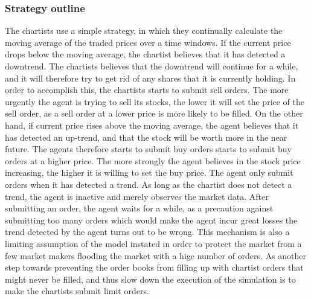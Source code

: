 \subsubsection{Strategy outline}
The chartists use a simple strategy, in which they continually calculate the moving average of the traded prices over a time windows. If the current price drops below the moving average, the chartist believes that it has detected a downtrend. The chartists believes that the downtrend will continue for a while, and it will therefore try to get rid of any shares that it is currently holding. In order to accomplish this, the chartists starts to submit sell orders. The more urgently the agent is trying to sell its stocks, the lower it will set the price of the sell order, as a sell order at a lower price is more likely to be filled. On the other hand, if current price rises above the moving average, the agent believes that it has detected an up-trend, and that the stock will be worth more in the near future. The agents therefore starts to submit buy orders starts to submit buy orders at a higher price. The more strongly the agent believes in the stock price increasing, the higher it is willing to set the buy price. The agent only submit orders when it has detected a trend. As long as the chartist does not detect a trend, the agent is inactive and merely observes the market data.  After submitting an order, the agent waits for a while, as a precaution against submitting too many orders which would make the agent incur great losses the trend detected by the agent turns out to be wrong. This mechanism is also a limiting assumption of the model instated in order to protect the market from a few market makers flooding the market with a hige number of orders. As another step towards preventing the order books from filling up with chartist orders that might never be filled, and thus slow down the execution of the simulation is to make the chartists submit limit orders.



